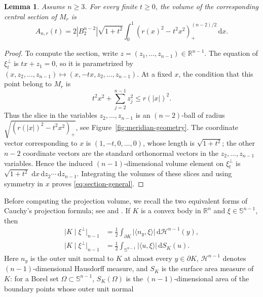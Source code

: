 \documentclass[11pt]{article}
\newtheorem{lemma}[theorem]{Lemma}
\theoremstyle{remark}
\newcommand{\R}{\mathbb{R}}
\newcommand{\Sph}{\mathbb{S}}
\newcommand{\dd}{\,\mathrm{d}}
\newcommand{\abs}[1]{\lvert #1\rvert}
\newcommand{\pos}[1]{(#1)_{+}}
\begin{document}
\begin{lemma}
\label{lem:volume-section-formulas}
Assume $n\geq3$.  For every finite $t\geq0$, the volume of the
corresponding central section of $M_r$ is
\begin{equation}\label{eq:section-general}
 A_{n,r}(t)
 =2|B_2^{n-2}|\sqrt{1+t^2}
 \int_0^1
 \pos{r(x)^2-t^2x^2}^{(n-2)/2}\dd x.
\end{equation}
\end{lemma}

\begin{proof}


To compute the section, write
$z=(z_1,\ldots,z_{n-1})\in\R^{n-1}$.  The equation of $\xi_t^\perp$ is
$tx+z_1=0$, so it is parametrized by
$
 (x,z_2,\ldots,z_{n-1})
 \longmapsto(x,-tx,z_2,\ldots,z_{n-1}).
$
At a fixed $x$, the condition that this point belong to $M_r$ is
\[
 t^2x^2+\sum_{j=2}^{n-1}z_j^2\leq r(\abs{x})^2.
\]
Thus the slice in the variables $z_2,\ldots,z_{n-1}$ is an $(n-2)$-ball of radius
$\sqrt{\pos{r(\abs{x})^2-t^2x^2}}$, see Figure~\ref{fig:meridian-geometry}.  The coordinate vector corresponding
to $x$ is $(1,-t,0,\ldots,0)$, whose length is $\sqrt{1+t^2}$; the other
$n-2$ coordinate vectors are the standard orthonormal vectors in the
$z_2,\ldots,z_{n-1}$ variables.  Hence the induced $(n-1)$-dimensional
volume element on $\xi_t^\perp$ is
$\sqrt{1+t^2}\,\dd x\dd z_2\cdots\dd z_{n-1}$.  Integrating the
volumes of these slices and using symmetry in $x$ proves
\eqref{eq:section-general}.
\end{proof}
Before computing the projection volume, we recall the two equivalent
forms of Cauchy's projection formula; see
\cite[Formula~(A.45), p.~408]{GardnerBook} and
\cite[Chapters~2 and~5]{SchneiderBook}.  If $K$ is a convex body in $\R^n$ and
$\xi\in\Sph^{n-1}$, then
\begin{align}
 \bigl|K\mid\xi^\perp\bigr|_{n-1}
 &=\frac12\int_{\partial K}\abs{\langle n_y,\xi\rangle}
                  \dd\mathcal H^{n-1}(y),
                  \label{eq:Cauchy-projection-boundary}\\
 \bigl|K\mid\xi^\perp\bigr|_{n-1}
 &=\frac12\int_{\Sph^{n-1}}\abs{\langle u,\xi\rangle}\dd S_K(u).
                  \label{eq:Cauchy-projection-sphere}
\end{align}
Here $n_y$ is the outer unit normal to $K$ at almost every
$y\in\partial K$, $\mathcal H^{n-1}$ denotes $(n-1)$-dimensional
Hausdorff measure, and $S_K$ is the surface area measure of $K$: for a
Borel set $\Omega\subset\Sph^{n-1}$, $S_K(\Omega)$ is the
$(n-1)$-dimensional area of the boundary points whose outer unit normal
\end{document}
